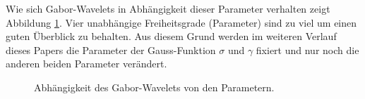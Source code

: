Wie sich Gabor-Wavelets in Abhängigkeit dieser Parameter verhalten zeigt Abbildung \ref{fig:kernels}.
Vier unabhängige Freiheitsgrade (Parameter) sind zu viel um einen guten Überblick zu behalten.
Aus diesem Grund werden im weiteren Verlauf dieses Papers die Parameter der Gauss-Funktion $\sigma$ und $\gamma$ fixiert und nur noch die anderen beiden Parameter verändert.

\begin{figure}
	\centering
	
	
	\caption{Abhängigkeit des Gabor-Wavelets von den Parametern.}
	\label{fig:kernels}
\end{figure}
